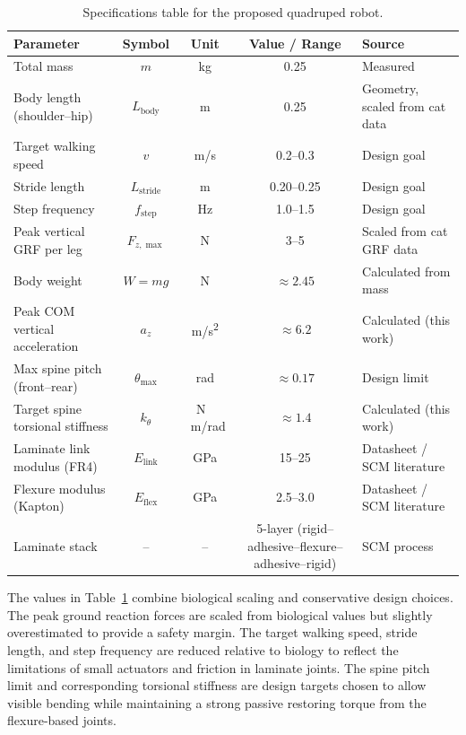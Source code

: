 \documentclass[11pt,letterpaper]{article}
\begin{document}
\begin{table}[H]
    \centering
    \caption{Specifications table for the proposed quadruped robot.}
    \label{tab:robot_specs}
    \begin{tabular}{lcccl}
        \toprule
        \textbf{Parameter} & \textbf{Symbol} & \textbf{Unit} &
        \textbf{Value / Range} & \textbf{Source} \\
        \midrule
        Total mass & $m$ & \si{kg} & 0.25 & Measured \\
        Body length (shoulder--hip) & $L_{\text{body}}$ & \si{m} &
        0.25 & Geometry, scaled from cat data \\
        Target walking speed & $v$ & \si{m/s} &
        0.2--0.3 & Design goal \\
        Stride length & $L_{\text{stride}}$ & \si{m} &
        0.20--0.25 & Design goal \\
        Step frequency & $f_{\text{step}}$ & \si{Hz} &
        1.0--1.5 & Design goal \\
        Peak vertical GRF per leg & $F_{z,\max}$ & \si{N} &
        3--5 & Scaled from cat GRF data \\
        Body weight & $W = mg$ & \si{N} &
        $\approx 2.45$ & Calculated from mass \\
        Peak COM vertical acceleration & $a_z$ & \si{m/s^2} &
        $\approx 6.2$ & Calculated (this work) \\
        Max spine pitch (front--rear) & $\theta_{\max}$ & \si{rad} &
        $\approx 0.17$ & Design limit \\
        Target spine torsional stiffness & $k_\theta$ & \si{N\,m/rad} &
        $\approx 1.4$ & Calculated (this work) \\
        Laminate link modulus (FR4) & $E_{\text{link}}$ & \si{GPa} &
        15--25 & Datasheet / SCM literature \\
        Flexure modulus (Kapton) & $E_{\text{flex}}$ & \si{GPa} &
        2.5--3.0 & Datasheet / SCM literature \\
        Laminate stack & -- & -- &
        5-layer (rigid--adhesive--flexure--adhesive--rigid) &
        SCM process~\cite{hoover_fearing,aukes_textbook} \\
        \bottomrule
    \end{tabular}
\end{table}

The values in Table~\ref{tab:robot_specs} combine biological scaling and
conservative design choices. The peak ground reaction forces are scaled from
biological values but slightly overestimated to provide a safety margin. The
target walking speed, stride length, and step frequency are reduced relative to
biology to reflect the limitations of small actuators and friction in laminate
joints. The spine pitch limit and corresponding torsional stiffness are design
targets chosen to allow visible bending while maintaining a strong passive
restoring torque from the flexure-based joints.
\end{document}
